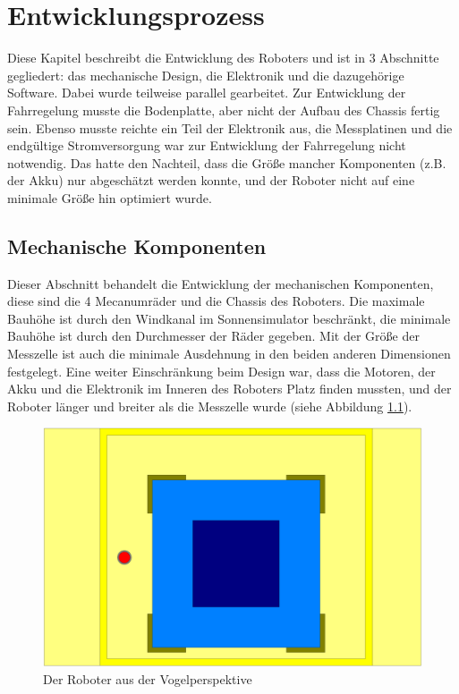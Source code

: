 \documentclass[a4paper,bibtotoc,oneside]{scrbook}
\begin{document}
\chapter{Entwicklungsprozess}\thispagestyle{empty}

Diese Kapitel beschreibt die Entwicklung des Roboters und ist in 3 Abschnitte gegliedert: das mechanische Design, die Elektronik und die dazugehörige Software.
Dabei wurde teilweise parallel gearbeitet. Zur Entwicklung der Fahrregelung musste die Bodenplatte, aber nicht der Aufbau des Chassis fertig sein. Ebenso musste reichte ein Teil der Elektronik aus, die Messplatinen und die endgültige Stromversorgung war zur Entwicklung der Fahrregelung nicht notwendig. Das hatte den Nachteil, dass die Größe mancher Komponenten (z.B. der Akku) nur abgeschätzt werden konnte, und der Roboter nicht auf eine minimale Größe hin optimiert wurde.

\section{Mechanische Komponenten}\thispagestyle{empty}

Dieser Abschnitt behandelt die Entwicklung der mechanischen Komponenten, diese sind die 4 Mecanumräder und die Chassis des Roboters. Die maximale Bauhöhe ist durch den Windkanal im Sonnensimulator beschränkt, die minimale Bauhöhe ist durch den Durchmesser der Räder gegeben.
Mit der Größe der Messzelle ist auch die minimale Ausdehnung in den beiden anderen Dimensionen festgelegt. Eine weiter Einschränkung beim Design war, dass die Motoren, der Akku und die Elektronik im Inneren des Roboters Platz finden mussten, und der Roboter länger und breiter als die Messzelle wurde (siehe Abbildung \ref{oben}).

\begin{figure}[htbp]
\centering
\includegraphics[width=125mm]{img/oben2.png}
\caption{Der Roboter aus der Vogelperspektive}\label{oben}
\end{figure}
  
\end{document}
